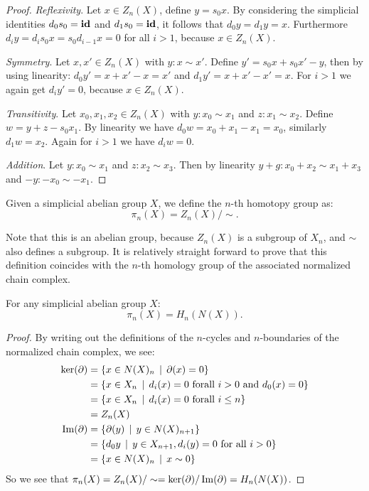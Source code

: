 \begin{proof}
	\emph{Reflexivity}. Let $x \in Z_n(X)$, define $y = s_0 x$. By considering the simplicial identities $d_0 s_0 = \mathbf{id}$ and $d_1 s_0 = \mathbf{id}$, it follows that $d_0 y = d_1 y = x$. Furthermore $d_i y = d_i s_0 x = s_0 d_{i-1} x = 0$ for all $i > 1$, because $x \in Z_n(X)$.

	\emph{Symmetry}. Let $x, x' \in Z_n(X)$ with $y: x \sim x'$. Define $y' = s_0 x + s_0 x' - y$, then by using linearity: $d_0 y' = x + x' - x = x'$ and $d_1 y' = x + x' - x' = x$. For $i>1$ we again get $d_i y' = 0$, because $x \in Z_n(X)$.

	\emph{Transitivity}. Let $x_0, x_1, x_2 \in Z_n(X)$ with $y: x_0 \sim x_1$ and $z: x_1 \sim x_2$. Define $w = y + z - s_0 x_1$. By linearity we have $d_0 w = x_0 + x_1 -x_1 = x_0$, similarly $d_1 w = x_2$. Again for $i>1$ we have $d_i w = 0$.

	\emph{Addition}. Let $y: x_0 \sim x_1$ and $z: x_2 \sim x_3$. Then by linearity $y + g: x_0 + x_2 \sim x_1 + x_3$ and $-y: -x_0 \sim -x_1$.
\end{proof}

\begin{definition}
	Given a simplicial abelian group $X$, we define the $n$-th homotopy group as:
	$$ \pi_n(X) = Z_n(X) / \sim. $$
\end{definition}

Note that this is an abelian group, because $Z_n(X)$ is a subgroup of $X_n$, and $\sim$ also defines a subgroup. It is relatively straight forward to prove that this definition coincides with the $n$-th homology group of the associated normalized chain complex.

\begin{lemma}
	For any simplicial abelian group $X$:
	$$ \pi_n(X) = H_n(N(X)). $$
\end{lemma}
\begin{proof}
	By writing out the definitions of the $n$-cycles and $n$-boundaries of the normalized chain complex, we see:
	\begin{align*}
		\ker(\partial) &= \{ x \in N(X)_n \,\mid\, \partial(x) = 0 \} \\
			&= \{ x \in X_n \,\mid\, d_i(x) = 0 \text{ forall } i > 0 \text{ and } d_0(x) = 0 \} \\
			&= \{ x \in X_n \,\mid\, d_i(x) = 0 \text{ forall } i \leq n \} \\
			&= Z_n(X) \\
		\operatorname{Im}(\partial) &= \{ \partial(y) \,\mid\, y \in N(X)_{n+1} \} \\
			&= \{ d_0 y \,\mid\, y \in X_{n+1}, d_i(y) = 0 \text{ for all } i > 0 \} \\
			&= \{ x \in N(X)_n \,\mid\, x \sim 0 \}
	\end{align*}
	So we see that $\pi_n(X) = Z_n(X) / \sim = \ker(\partial) / \operatorname{Im}(\partial) = H_n(N(X))$.
\end{proof}

